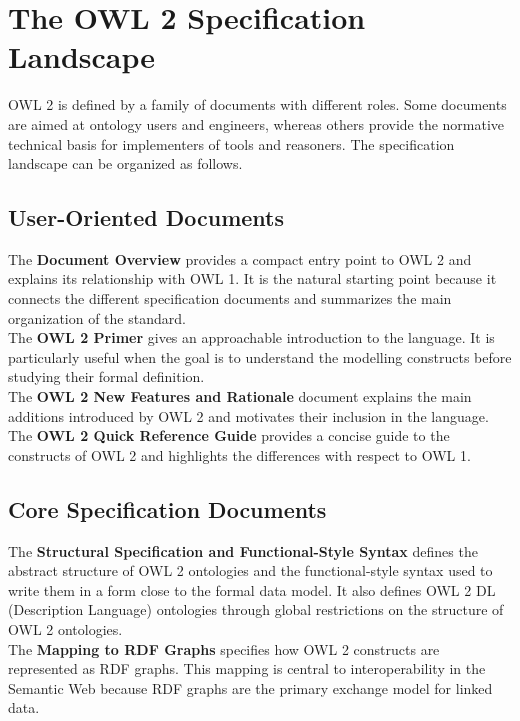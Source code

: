 \documentclass{scrbook}
\begin{document}
	\section{The OWL 2 Specification Landscape}
	
	OWL 2 is defined by a family of documents with different roles. Some documents are aimed at ontology users and engineers, whereas others provide the normative technical basis for implementers of tools and reasoners. The specification landscape can be organized as follows.
	
	\subsection{User-Oriented Documents}
	
	The \textbf{Document Overview} provides a compact entry point to OWL 2 and explains its relationship with OWL 1. It is the natural starting point because it connects the different specification documents and summarizes the main organization of the standard.\\
	
	The \textbf{OWL 2 Primer} gives an approachable introduction to the language. It is particularly useful when the goal is to understand the modelling constructs before studying their formal definition.\\
	
	The \textbf{OWL 2 New Features and Rationale} document explains the main additions introduced by OWL 2 and motivates their inclusion in the language.\\
	
	The \textbf{OWL 2 Quick Reference Guide} provides a concise guide to the constructs of OWL 2 and highlights the differences with respect to OWL 1.
	
	\subsection{Core Specification Documents}
	
	The \textbf{Structural Specification and Functional-Style Syntax} defines the abstract structure of OWL 2 ontologies and the functional-style syntax used to write them in a form close to the formal data model. It also defines OWL 2 DL (Description Language) ontologies through global restrictions on the structure of OWL 2 ontologies.\\
	
	The \textbf{Mapping to RDF Graphs} specifies how OWL 2 constructs are represented as RDF graphs. This mapping is central to interoperability in the Semantic Web because RDF graphs are the primary exchange model for linked data.\\
	
\end{document}
